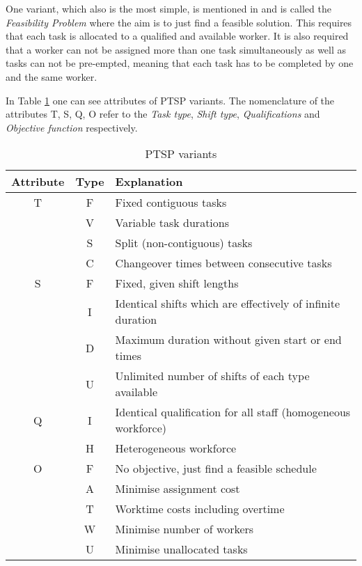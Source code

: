 One variant, which also is the most simple, is mentioned in \cite{krishnamoorthy_2001} and is called the \textit{Feasibility Problem} where the aim is to just find a feasible solution. This requires that each task is allocated to a qualified and available worker. It is also required that a worker can not be assigned more than one task simultaneously as well as tasks can not be pre-empted, meaning that each task has to be completed by one and the same worker.

In Table \ref{PTSP} one can see attributes of PTSP variants. The nomenclature of the attributes T, S, Q, O refer to the \textit{Task type}, \textit{Shift type}, \textit{Qualifications} and \textit{Objective function} respectively. 
\begin{table}[H]
\caption{PTSP variants}
\label{PTSP}
\begin{tabular}{|c|c|l|}
\hline
\textbf{Attribute} & \textbf{Type} & \textbf{Explanation} \\ \hline
T & F & Fixed contiguous tasks \\
& V & Variable task durations \\
& S & Split (non-contiguous) tasks \\
& C & Changeover times between consecutive tasks \\
\hline 
S & F & Fixed, given shift lengths \\
& I & Identical shifts which are effectively of infinite duration \\
& D & Maximum duration without given start or end times \\
& U & Unlimited number of shifts of each type available \\
\hline 
Q & I & Identical qualification for all staff (homogeneous workforce) \\
& H & Heterogeneous workforce \\
\hline 
O & F & No objective, just find a feasible schedule \\
& A & Minimise assignment cost \\
& T & Worktime costs including overtime \\
& W & Minimise number of workers \\
& U & Minimise unallocated tasks \\
\hline  

\end{tabular}
\end{table}

